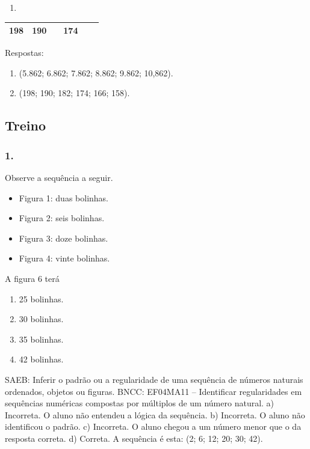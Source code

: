 \begin{enumerate}
\begin{escolha}
\begin{enumerate}
\begin{enumerate}
\def\labelenumi{\alph{enumi})}
\item
\end{enumerate}

\begin{longtable}[]{@{}llllll@{}}
\toprule
198 & 190 &  & 174 &  & \tabularnewline
\bottomrule
\end{longtable}

Respostas:

\begin{enumerate}
\def\labelenumi{\alph{enumi})}
\item
  (5.862; 6.862; 7.862; 8.862; 9.862; 10,862).
\item
  (198; 190; 182; 174; 166; 158).
\end{enumerate}

\subsection{Treino}\label{treino-2}

\subsubsection{1.}\label{section-36}

Observe a sequência a seguir.

\begin{itemize}
  \item Figura 1: duas bolinhas.
  \item Figura 2: seis bolinhas.
  \item Figura 3: doze bolinhas.
  \item Figura 4: vinte bolinhas.
\end{itemize}

 A figura 6 terá

\begin{enumerate}
\def\labelenumi{\alph{enumi})}
\item
  25 bolinhas.
\item
  30 bolinhas.
\item
  35 bolinhas.
\item
  42 bolinhas.
\end{enumerate}

SAEB: Inferir o padrão ou a regularidade de uma sequência de números naturais ordenados, objetos ou figuras.
BNCC: EF04MA11 -- Identificar regularidades em sequências numéricas compostas por múltiplos de um
número natural.
a) Incorreta. O aluno não entendeu a lógica da sequência.
b) Incorreta. O aluno não identificou o padrão.
c) Incorreta. O aluno chegou a um número menor que o da resposta correta.
d) Correta. A sequência é esta: (2; 6; 12; 20; 30; 42).



\end{enumerate}
\end{escolha}
\end{enumerate}
